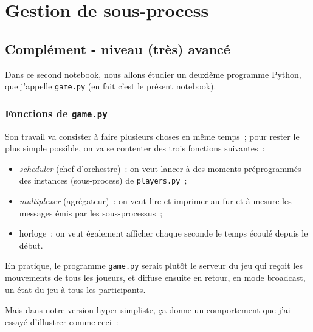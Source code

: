     
    
    
    

    

    \hypertarget{gestion-de-sous-process}{%
\section{Gestion de sous-process}\label{gestion-de-sous-process}}

    \hypertarget{compluxe9ment---niveau-truxe8s-avancuxe9}{%
\subsection{Complément - niveau (très)
avancé}\label{compluxe9ment---niveau-truxe8s-avancuxe9}}

    Dans ce second notebook, nous allons étudier un deuxième programme
Python, que j'appelle \texttt{game.py} (en fait c'est le présent
notebook).

    \hypertarget{fonctions-de-game.py}{%
\subsubsection{\texorpdfstring{Fonctions de
\texttt{game.py}}{Fonctions de game.py}}\label{fonctions-de-game.py}}

    Son travail va consister à faire plusieurs choses en même temps~; pour
rester le plus simple possible, on va se contenter des trois fonctions
suivantes~:

\begin{itemize}
\tightlist
\item
  \emph{scheduler} (chef d'orchestre)~: on veut lancer à des moments
  préprogrammés des instances (sous-process) de \texttt{players.py}~;
\item
  \emph{multiplexer} (agrégateur)~: on veut lire et imprimer au fur et à
  mesure les messages émis par les sous-processus~;
\item
  horloge~: on veut également afficher chaque seconde le temps écoulé
  depuis le début.
\end{itemize}

    En pratique, le programme \texttt{game.py} serait plutôt le serveur du
jeu qui reçoit les mouvements de tous les joueurs, et diffuse ensuite en
retour, en mode broadcast, un état du jeu à tous les participants.

    Mais dans notre version hyper simpliste, ça donne un comportement que
j'ai essayé d'illustrer comme ceci~:

